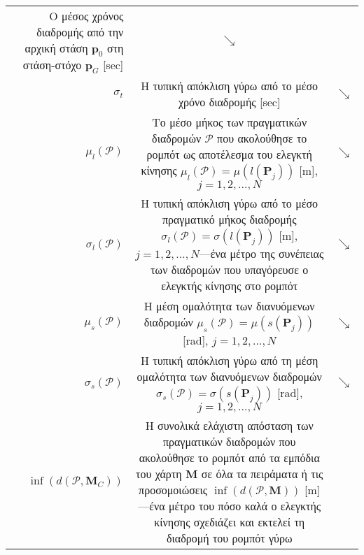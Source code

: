 \begin{table}
\begin{tabular}{rcc}
\begin{minipage}[t]{0.7\columnwidth}
      Ο μέσος χρόνος διαδρομής από την αρχική στάση $\bm{p}_0$ στη στάση-στόχο
      $\bm{p}_G$ [sec]
      \end{minipage} & $\searrow$ \\
    $\sigma_{t}$ &
    \begin{minipage}[t]{0.7\columnwidth}%
      Η τυπική απόκλιση γύρω από το μέσο χρόνο διαδρομής [sec]
      \end{minipage} & $\searrow$ \\
    $\mu_{l}(\bm{\mathcal{P}})$ &
    \begin{minipage}[t]{0.7\columnwidth}%
      Το μέσο μήκος των πραγματικών διαδρομών $\bm{\mathcal{P}}$ που ακολούθησε
      το ρομπότ ως αποτέλεσμα του ελεγκτή κίνησης
      $\mu_l(\bm{\mathcal{P}}) = \mu(l(\bm{P}_j))$ [m], $j = 1,2,\dots,N$
      \end{minipage} & $\searrow$ \\
    $\sigma_{l}(\bm{\mathcal{P}})$ &
    \begin{minipage}[t]{0.7\columnwidth}%
      Η τυπική απόκλιση γύρω από το μέσο πραγματικό μήκος διαδρομής
      $\sigma_l(\bm{\mathcal{P}}) = \sigma(l(\bm{P}_j))$ [m],
      $j = 1,2,\dots,N$---ένα μέτρο της συνέπειας των διαδρομών που υπαγόρευσε
      ο ελεγκτής κίνησης στο ρομπότ
      \end{minipage} & $\searrow$ \\
    $\mu_{s}(\bm{\mathcal{P}})$ &
    \begin{minipage}[t]{0.7\columnwidth}%
      Η μέση ομαλότητα των διανυόμενων διαδρομών
      $\mu_s(\bm{\mathcal{P}}) = \mu(s(\bm{P}_j))$ [rad], $j = 1,2,\dots,N$
      \end{minipage} & $\searrow$ \\
    $\sigma_{s}(\bm{\mathcal{P}})$ &
    \begin{minipage}[t]{0.7\columnwidth}%
      Η τυπική απόκλιση γύρω από τη μέση ομαλότητα των διανυόμενων διαδρομών
      $\sigma_s(\bm{\mathcal{P}}) = \sigma(s(\bm{P}_j))$ [rad], $j = 1,2,\dots,N$
      \end{minipage} & $\searrow$ \\
    $\inf(d(\bm{\mathcal{P}},\bm{M}_C))$ &
    \begin{minipage}[t]{0.7\columnwidth}%
      Η συνολικά ελάχιστη απόσταση των πραγματικών διαδρομών που ακολούθησε το
      ρομπότ από τα εμπόδια του χάρτη $\bm{M}$ σε όλα τα πειράματα ή τις
      προσομοιώσεις $\inf(d(\bm{\mathcal{P}}, \bm{M}))$ [m]---ένα μέτρο του πόσο
      καλά ο ελεγκτής κίνησης σχεδιάζει και εκτελεί τη διαδρομή του ρομπότ γύρω

\end{minipage}
\end{tabular}
\end{table}
